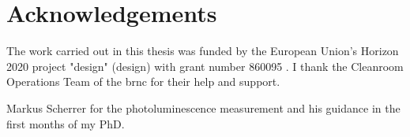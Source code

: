 \chapter{Acknowledgements}

The work carried out in this thesis was funded by the European Union's Horizon 2020 project "\acl{design}" (\acs{design}) with grant number 860095 \cite{CordisDESIGN}. I thank the Cleanroom Operations Team of the \acl{brnc} for their help and support. 

Markus Scherrer for the photoluminescence measurement and his guidance in the first months of my PhD.